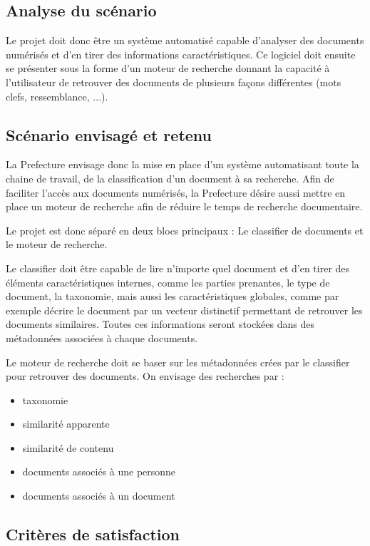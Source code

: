 
\subsection {Analyse du scénario}
Le projet doit donc être un système automatisé capable d'analyser des documents numérisés et d'en tirer des informations caractéristiques.
Ce logiciel doit ensuite se présenter sous la forme d'un moteur de recherche donnant la capacité à l'utilisateur de retrouver des documents de plusieurs façons différentes (mots clefs, ressemblance, ...).



\subsection {Scénario envisagé et retenu}
La Prefecture envisage donc la mise en place d'un système automatisant toute la chaine de travail, de la classification d'un document à sa recherche.
Afin de faciliter l'accès aux documents numérisés, la Prefecture désire aussi mettre en place un moteur de recherche afin de réduire le temps de recherche documentaire.

Le projet est donc séparé en deux blocs principaux :
Le classifier de documents et le moteur de recherche.

Le classifier doit être capable de lire n'importe quel document et d'en tirer des éléments caractéristiques internes, comme les parties prenantes, le type de document, la taxonomie, mais aussi les caractéristiques globales, comme par exemple décrire le document par un vecteur distinctif permettant de retrouver les documents similaires.
Toutes ces informations seront stockées dans des métadonnées associées à chaque documents.


Le moteur de recherche doit se baser sur les métadonnées crées par le classifier pour retrouver des documents.
On envisage des recherches par :
\begin {itemize}
\item taxonomie
\item similarité apparente
\item similarité de contenu
\item documents associés à une personne
\item documents associés à un document
\end {itemize}



\subsection {Critères de satisfaction}

